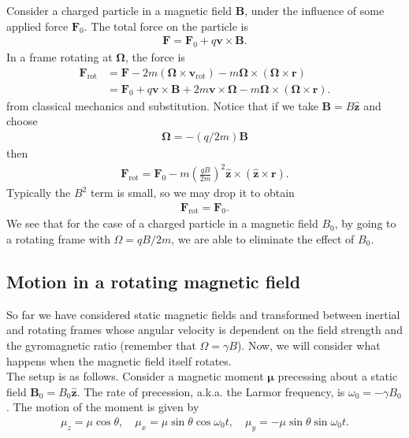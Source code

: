\documentclass{book}
\theoremstyle{definition}
\newcommand{\f}[2]{\frac{#1}{#2}}
\newcommand{\lp}{\left(}
\newcommand{\rp}{\right)}
\begin{document}
Consider a charged particle in a magnetic field $\bm{B}$, under the influence of some applied force $\bm{F}_0$. The total force on the particle is 
\begin{align*}
	\bm{F} = \bm{F}_0 + q\bm{v}\times \bm{B}.
\end{align*}
In a frame rotating at $\bm{\Omega}$, the force is 
\begin{align*}
\bm{F}_{\text{rot}} &= \bm{F} - 2m(\bm{\Omega}\times \bm{v}_\text{rot}) - m\bm{\Omega} \times (\bm{\Omega}\times \bm{r})\\
&= \bm{F}_0 + q\bm{v}\times \bm{B} + 2m\bm{v}\times \bm{\Omega} - m\bm{\Omega}\times (\bm{\Omega}\times \bm{r}).
\end{align*}
from classical mechanics and substitution. Notice that if we take $\bm{B} = B\hat{\bm{z}}$ and choose 
\begin{align*}
	\bm{\Omega} = -(q/2m)\bm{B}
\end{align*}
then 
\begin{align*}
	\bm{F}_\text{rot} = \bm{F}_0 - m\lp \f{qB}{2m} \rp^2 \hat{\bm{z}} \times (\hat{\bm{z}} \times \bm{r}).
\end{align*}
Typically the $B^2$ term is small, so we may drop it to obtain 
\begin{align*}
	\bm{F}_\text{rot} = \bm{F}_0.
\end{align*}
We see that for the case of a charged particle in a magnetic field $B_0$, by going to a rotating frame with $\Omega = qB/2m $, we are able to eliminate the effect of $B_0$.





\subsection{Motion in a rotating magnetic field}

So far we have considered static magnetic fields and transformed between inertial and rotating frames whose angular velocity is dependent on the field strength and the gyromagnetic ratio (remember that $\Omega = \gamma B$). Now, we will consider what happens when the magnetic field itself rotates. \\


The setup is as follows. Consider a magnetic moment $\bm{\mu}$ precessing about a static field $\bm{B}_0 = B_0 \hat{\bm{z}}$. The rate of precession, a.k.a. the Larmor frequency, is $\omega_0 = -\gamma B_0$. The motion of the moment is given by 
\begin{align*}
	\mu_z = \mu\cos\theta, \quad \mu_x = \mu\sin\theta \cos\omega_0t, \quad \mu_y = -\mu\sin\theta \sin\omega_0 t.
\end{align*}
\end{document}
